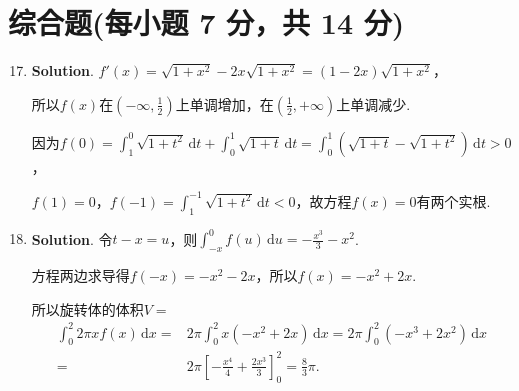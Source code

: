 \documentclass[../Main.tex]{subfiles}
\begin{document}
\section{综合题(每小题 7 分，共 14 分)}
\begin{enumerate}
    \setcounter{enumi}{16}
    \item \textbf{Solution}. $f'(x)=\sqrt{1+x^{2}}-2x\sqrt{1+x^{2}}=(1-2x)\sqrt{1+x^{2}}$，

          所以$f(x)$在$\left(-\infty,\frac{1}{2}\right)$上单调增加，在$\left(\frac{1}{2}
              ,+\infty\right)$上单调减少.

          因为$f(0)=\int_{1}^{0}\sqrt{1+t^{2}}\,\mathrm{d}t+\int_{0}^{1}\sqrt{1+t}\,\mathrm{d}
              t=\int_{0}^{1}\left(\sqrt{1+t}-\sqrt{1+t^{2}}\right)\,\mathrm{d}t>0$，

          $f(1)=0$，$f(-1)=\int_{1}^{-1}\sqrt{1+t^{2}}\,\mathrm{d}t<0$，故方程$f(x)=0$有两个实根.

    \item \textbf{Solution}. 令$t-x=u$，则$\int_{-x}^{0}f(u)\,\mathrm{d}u=-\frac{x^{3}}{3}
              -x^{2}$.

          方程两边求导得$f(-x)=-x^{2}-2x$，所以$f(x)=-x^{2}+2x$.

          所以旋转体的体积$V=$
          \[
              \begin{aligned}
                  \int_{0}^{2}2\pi xf(x)\,\mathrm{d}x = & 2\pi\int_{0}^{2}x(-x^{2}+2x)\,\mathrm{d}x = 2\pi\int_{0}^{2}(-x^{3}+2x^{2})\,\mathrm{d}x \\
                  =                                     & 2\pi\left[-\frac{x^4}{4}+\frac{2x^3}{3}\right]_{0}^{2}= \frac{8}{3}\pi.
              \end{aligned}
          \]
\end{enumerate}
\end{document}
